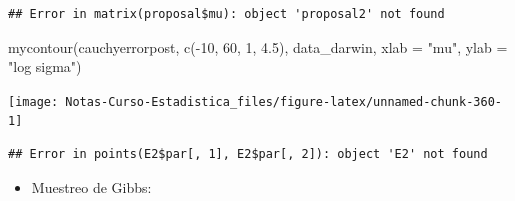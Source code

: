 \documentclass[
  12pt,
]{book}
\newenvironment{Shaded}{\begin{snugshade}}{\end{snugshade}}
\newcommand{\AttributeTok}[1]{\textcolor[rgb]{0.77,0.63,0.00}{#1}}
\newcommand{\DecValTok}[1]{\textcolor[rgb]{0.00,0.00,0.81}{#1}}
\newcommand{\FloatTok}[1]{\textcolor[rgb]{0.00,0.00,0.81}{#1}}
\newcommand{\FunctionTok}[1]{\textcolor[rgb]{0.00,0.00,0.00}{#1}}
\newcommand{\NormalTok}[1]{#1}
\newcommand{\OtherTok}[1]{\textcolor[rgb]{0.56,0.35,0.01}{#1}}
\newcommand{\SpecialCharTok}[1]{\textcolor[rgb]{0.00,0.00,0.00}{#1}}
\newcommand{\StringTok}[1]{\textcolor[rgb]{0.31,0.60,0.02}{#1}}
\providecommand{\tightlist}{%
  \setlength{\itemsep}{0pt}\setlength{\parskip}{0pt}}
\theoremstyle{definition}
\theoremstyle{definition}
\theoremstyle{definition}
\theoremstyle{definition}
\theoremstyle{remark}
\begin{document}
\begin{verbatim}
## Error in matrix(proposal$mu): object 'proposal2' not found
\end{verbatim}

\begin{Shaded}
\begin{Highlighting}[]
\FunctionTok{mycontour}\NormalTok{(cauchyerrorpost, }\FunctionTok{c}\NormalTok{(}\SpecialCharTok{{-}}\DecValTok{10}\NormalTok{, }\DecValTok{60}\NormalTok{, }\DecValTok{1}\NormalTok{, }\FloatTok{4.5}\NormalTok{), data\_darwin,}
    \AttributeTok{xlab =} \StringTok{"mu"}\NormalTok{, }\AttributeTok{ylab =} \StringTok{"log sigma"}\NormalTok{)}
\end{Highlighting}
\end{Shaded}

\begin{center}\texttt{[image: Notas-Curso-Estadistica\_files/figure-latex/unnamed-chunk-360-1]} \end{center}

\begin{Shaded}
\end{Shaded}

\begin{verbatim}
## Error in points(E2$par[, 1], E2$par[, 2]): object 'E2' not found
\end{verbatim}

\begin{itemize}
\tightlist
\item
  Muestreo de Gibbs:
\end{itemize}

\begin{Shaded}
\end{Shaded}
\end{document}
